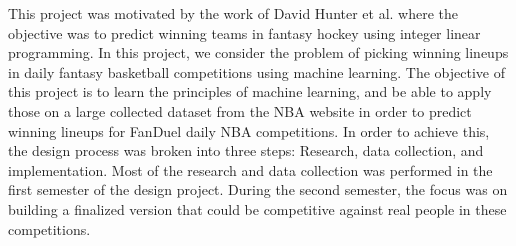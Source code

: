 This project was motivated by the work of David Hunter et al. \cite{picking_winners} where the objective was to predict winning teams in fantasy hockey using integer linear programming. In this project, we consider the problem of picking winning lineups in daily fantasy basketball competitions using machine learning. The objective of this project is to learn the principles of machine learning, and be able to apply those on a large collected dataset from the NBA website in order to predict winning lineups for FanDuel daily NBA competitions. In order to achieve this, the design process was broken into three steps: Research, data collection, and implementation. Most of the research and data collection was performed in the first semester of the design project. During the second semester, the focus was on building a finalized version that could be competitive against real people in these competitions.